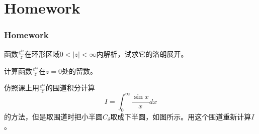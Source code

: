 \documentclass[CJK]{beamer}
\begin{document}
\section{Homework}
\begin{frame}
  \frametitle{Homework}
  
  \bitem
\item{函数$\frac{e^{iz}}{z}$在环形区域$0<|z|<\infty$内解析，试求它的洛朗展开。}
\item{计算函数$\frac{e^{iz}}{z}$在$z=0$处的留数。}
\item{仿照课上用$\frac{e^{iz}}{z}$的围道积分计算
  $$I=\int_0^{\infty}\frac{\sin x}{x}dx$$
  的方法，但是取围道时把小半圆$C_\delta$取成下半圆，如图所示。用这个围道重新计算$I$。
  
}
  \eitem
    
\end{frame}

\ech
\end{document}
